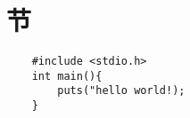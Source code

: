 \documentclass{article}
\begin{document}
\section{节}

\begin{verbatim}
    #include <stdio.h>
    int main(){
        puts("hello world!);
    }
\end{verbatim}
\end{document}

